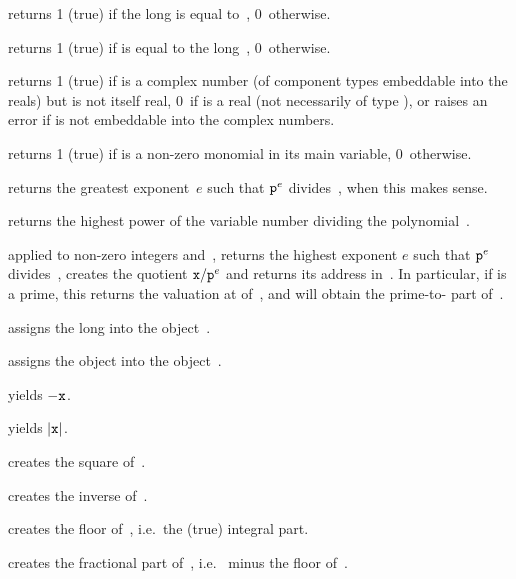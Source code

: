  returns 1 (true) if the long  is
equal to~, 0~otherwise.

 returns 1 (true) if  is equal to
the long~, 0~otherwise.

 returns 1 (true) if  is a complex number
(of component types embeddable into the reals) but is not itself real, 0~if
 is a real (not necessarily of type ), or raises an error if
 is not embeddable into the complex numbers.

 returns 1 (true) if  is a non-zero
monomial in its main variable, 0~otherwise.

 returns the greatest exponent~$e$ such that
${\tt p}^e$ divides~, when this makes sense.

 returns the highest power of the variable
number  dividing the polynomial~.

 applied to non-zero integers
 and~, returns the highest exponent $e$ such that
${\tt p}^{e}$ divides~, creates the quotient ${\tt x}/{\tt p}^{e}$
and returns its address in~.
In particular, if  is a prime, this returns the valuation at 
of~, and  will obtain the prime-to- part of~.


 assigns the long  into the
object~.

 assigns the object  into the
object~.


 yields $-{\tt x}$.

 yields $|{\tt x}|$.

 creates the square of~.

 creates the inverse of~.

 creates the floor of~, i.e.\ the (true)
integral part.

 creates the fractional part of~, i.e.\ 
minus the floor of~.

